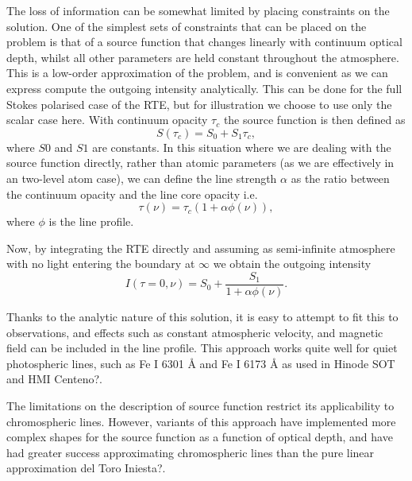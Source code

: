 The loss of information can be somewhat limited by placing constraints on the solution. One of the simplest sets of constraints that can be placed on the problem is that of a source function that changes linearly with continuum optical depth, whilst all other parameters are held constant throughout the atmosphere.
This is a low-order approximation of the problem, and is convenient as we can express compute the outgoing intensity analytically.
This can be done for the full Stokes polarised case of the RTE, but for illustration we choose to use only the scalar case here.
With continuum opacity $\tau_c$ the source function is then defined as
\begin{equation}
    S(\tau_c) = S_0 + S_1 \tau_c,
\end{equation}
where $S0$ and $S1$ are constants.
In this situation where we are dealing with the source function directly, rather than atomic parameters (as we are effectively in an two-level atom case), we can define the line strength $\alpha$ as the ratio between the continuum opacity and the line core opacity i.e.
\begin{equation}
    \tau(\nu) = \tau_c (1 + \alpha \phi(\nu)),
\end{equation}
where $\phi$ is the line profile.

Now, by integrating the RTE directly and assuming as semi-infinite atmosphere with no light entering the boundary at $\infty$ we obtain the outgoing intensity
\begin{equation}
I(\tau=0, \nu) = S_0 + \frac{S_1}{1 + \alpha\phi(\nu)}.
\end{equation}

Thanks to the analytic nature of this solution, it is easy to attempt to fit this to observations, and effects such as constant atmospheric velocity, and magnetic field can be included in the line profile.
This approach works quite well for quiet photospheric lines, such as Fe I 6301 \AA{} and Fe I 6173 \AA{} as used in Hinode SOT and HMI \NeedRef{} Centeno?.

The limitations on the description of source function restrict its applicability to chromospheric lines.
However, variants of this approach have implemented more complex shapes for the source function as a function of optical depth, and have had greater success approximating chromospheric lines than the pure linear approximation \NeedRef{} del Toro Iniesta?.

